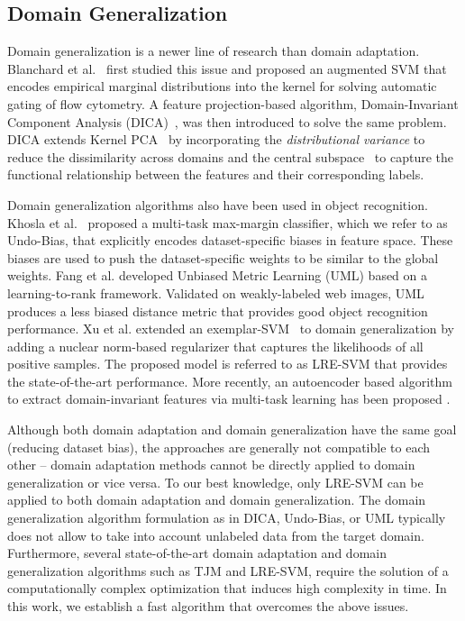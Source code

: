 \documentclass[10pt,journal,compsoc]{IEEEtran}
\begin{document}
\vspace{-0.5em}
\subsection{Domain Generalization}
Domain generalization is a newer line of research than domain adaptation.
Blanchard et al.~\cite{Blanchard2011} first studied this issue and proposed an augmented SVM that encodes empirical marginal distributions into the kernel for solving automatic gating of flow cytometry.
A feature projection-based algorithm, Domain-Invariant Component Analysis (DICA)~\cite{Muandet2013}, was then introduced to solve the same problem.
DICA extends Kernel PCA~\cite{Scholkopf1998} by incorporating the \emph{distributional variance} to reduce the dissimilarity across domains and the central subspace~\cite{COIR:2011} to capture the functional relationship between the features and their corresponding labels.

Domain generalization algorithms also have been used in object recognition.
Khosla et al.~\cite{Khosla2012} proposed a multi-task max-margin classifier, which we refer to as Undo-Bias, that explicitly encodes dataset-specific biases in feature space.
These biases are used to push the dataset-specific weights to be similar to the global weights. 
Fang et al.\cite{Fang2013} developed Unbiased Metric Learning (UML) based on a learning-to-rank framework. 
Validated on weakly-labeled web images, UML produces a less biased distance metric that provides good object recognition performance.
Xu et al.\cite{Xu2014} extended an exemplar-SVM~\cite{Malisiewicz:2011} to domain generalization by adding a nuclear norm-based regularizer that captures the likelihoods of all positive samples. 
The proposed model is referred to as LRE-SVM that provides the state-of-the-art performance.
More recently, an autoencoder based algorithm to extract domain-invariant features via multi-task learning has been proposed \cite{Ghifary:ICCV2015}.

Although both domain adaptation and domain generalization have the same goal (reducing dataset bias), the approaches are generally not compatible to each other -- domain adaptation methods cannot be directly applied to domain generalization or vice versa.
To our best knowledge, only LRE-SVM can be applied to both domain adaptation and domain generalization.
The domain generalization algorithm formulation as in DICA, Undo-Bias, or UML typically does not allow to take into account unlabeled data from the target domain.
Furthermore, several state-of-the-art domain adaptation and domain generalization algorithms such as TJM and LRE-SVM, require the solution of a computationally complex optimization that induces high complexity in time.
In this work, we establish a fast algorithm that overcomes the above issues.
\end{document}
